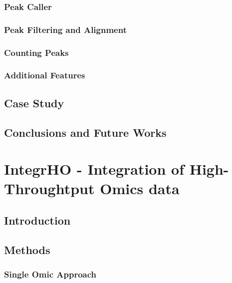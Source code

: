 \documentclass[b5paper,oneside,british,intoc,bibliograph=totoc,index=totoc,BCOR10mm,twoside,openright]{book}
\numberwithin{equation}{section}
\numberwithin{figure}{section}
\begin{document}
\subsection{Peak Caller} \label{sec:descan2peakcall}


\subsection{Peak Filtering and Alignment} \label{sec:descan2filtering}


\subsection{Counting Peaks} \label{sec:descan2peakcounts}


\subsection{Additional Features} \label{sec:descan2addfeat}


\section{Case Study} \label{sec:descan2results}


\section{Conclusions and Future Works} \label{sec:descan2next}


\chapter{IntegrHO - Integration of High-Throughtput Omics data}
\section{Introduction}
\section{Methods}
\subsection{Single Omic Approach}
\end{document}
